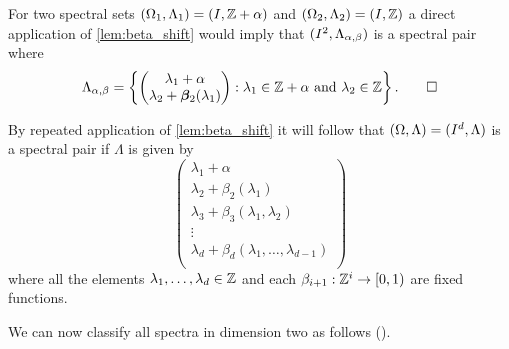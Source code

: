 \documentclass[../thesis.tex]{subfiles}
\begin{document}
\begin{example}
    For two spectral sets $(\Omega_1,\Lambda_1)=(I, \mathbb{Z}+\alpha)$ and $(\Omega_2,\Lambda_2)=(I, \mathbb{Z})$ a direct application of \cref{lem:beta_shift} would imply that $(I^2,\Lambda_{\alpha,\beta})$ is a spectral pair where
    \begin{equation*}
        \Lambda_{\alpha,\beta} 
        = \left\{\begin{pmatrix}
            \lambda_1 +\alpha\\
            \lambda_2+\bm{\beta}_2(\lambda_1)
            \end{pmatrix}
        : \lambda_1 \in \mathbb{Z} +\alpha \text{ and } \lambda_2 \in \mathbb{Z}\right\}. \qedhere
    \end{equation*}
\end{example}


\begin{example}
    By repeated application of \cref{lem:beta_shift} it will follow that $(\Omega,\Lambda)= (I^d, \Lambda)$ is a spectral pair if $\Lambda$ is given by %
    \begin{equation*}
        \begin{pmatrix}
            \lambda_1 +\alpha\\
            \lambda_2+\beta_2(\lambda_1)\\
            \lambda_3+\beta_3(\lambda_1,\lambda_2)\\
            \vdots\\
            \lambda_d+\beta_d(\lambda_1,\dots,\lambda_{d-1})\\
        \end{pmatrix}
    \end{equation*}
    where all the elements $\lambda_1, \dots, \lambda_d \in \mathbb{Z}$ and each $\beta_{i+1}:\mathbb{Z}^{i} \rightarrow [0,1)$ are fixed functions.
\end{example}

We can now classify all spectra in dimension two as follows (\cite{jorgensenSpectralPairsCartesian2001}). 
\end{document}
